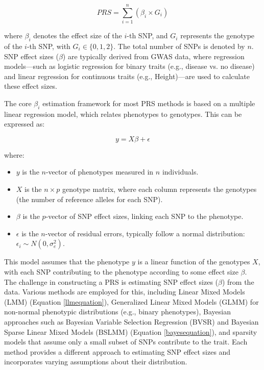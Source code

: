 \documentclass[pdflatex,sn-nature]{sn-jnl}%
\begin{document}
\begin{equation}
PRS = \sum_{i=1}^{n} \left( \beta_i \times G_i \right)
\label{Plinkequation}
\end{equation}

where \( \beta_i \) denotes the effect size of the \(i\)-th SNP, and \( G_i \) represents the genotype of the \(i\)-th SNP, with \( G_i \in \{0, 1, 2\} \). The total number of SNPs is denoted by \(n\). SNP effect sizes (\({\beta}\)) are typically derived from GWAS data, where regression models—such as logistic regression for binary traits (e.g., disease vs. no disease) and linear regression for continuous traits (e.g., Height)—are used to calculate these effect sizes.

The core \( \beta_i \) estimation framework for most PRS methods is based on a multiple linear regression model, which relates phenotypes to genotypes. This can be expressed as:

\begin{equation}
y = X\beta + \epsilon
\label{equation2}
\end{equation}

where:
\begin{itemize}
    \item \(y\) is the \(n\)-vector of phenotypes measured in \(n\) individuals.
    \item \(X\) is the \(n \times p\) genotype matrix, where each column represents the genotypes (the number of reference alleles for each SNP).
    \item \(\beta\) is the \(p\)-vector of SNP effect sizes, linking each SNP to the phenotype.
    \item \(\epsilon\) is the \(n\)-vector of residual errors, typically follow a normal distribution: \(\epsilon_i \sim N(0, \sigma_e^2)\).
\end{itemize}

This model assumes that the phenotype \(y\) is a linear function of the genotypes \(X\), with each SNP contributing to the phenotype according to some effect size \(\beta\). The challenge in constructing a PRS is estimating SNP effect sizes (\(\beta\)) from the data. Various methods are employed for this, including Linear Mixed Models (LMM) (Equation \ref{llmequation}), Generalized Linear Mixed Models (GLMM) for non-normal phenotypic distributions (e.g., binary phenotypes), Bayesian approaches such as Bayesian Variable Selection Regression (BVSR) and Bayesian Sparse Linear Mixed Models (BSLMM) (Equation \ref{bayesequation}), and sparsity models that assume only a small subset of SNPs contribute to the trait. Each method provides a different approach to estimating SNP effect sizes and incorporates varying assumptions about their distribution.
\end{document}
